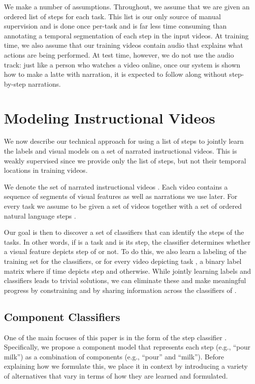 \documentclass[10pt,twocolumn,letterpaper]{article}
\begin{document}
We make a number of assumptions.
Throughout, we assume that we are given an ordered list of steps for each task.
This list is our only source of manual supervision and is done once per-task and
is far less time consuming than annotating a temporal segmentation of each step
in the input videos. At training time,
we also assume that our training videos contain audio that explains what actions are being performed. At test time, however,
we do not use the audio track: just like a person who watches a video online, once
our system is shown how to make a latte with narration, it is expected to follow along
without step-by-step narrations.

\section{Modeling Instructional Videos}
\label{sec:model}
We now describe our technical approach for using a list of steps
to jointly learn the labels and visual models on a set of
narrated instructional videos. This is weakly supervised since
we provide only the list of steps, but not their temporal locations
in training videos.

We denote the set of narrated instructional videos . Each video
 contains a sequence of  segments of visual features 
as well as narrations we use later.
For every task  we assume to be given a set of videos 
together with a set of ordered natural language steps .

Our goal is then to discover a set of classifiers  that can identify the steps of the tasks.
In other words, if  is a task and  is its step, the classifier 
determines whether a visual feature depicts step  of  or not.
To do this, we also learn a labeling  of the
training set for the classifiers, or for every video  depicting task ,
a binary label matrix  where  if
time  depicts step  and  otherwise. While jointly learning labels and
classifiers leads to trivial solutions, we can eliminate these and make
meaningful progress by constraining  and by sharing information across the
classifiers of .

\subsection{Component Classifiers}

One of the main focuses of this paper is in the form of the step classifier .
Specifically, we propose a component model that represents each step (e.g., ``pour milk'')
as a combination of components (e.g., ``pour'' and ``milk''). Before explaining how
we formulate this, we place it in context by introducing a variety of alternatives that
vary in terms of how they are learned and formulated.
\end{document}
